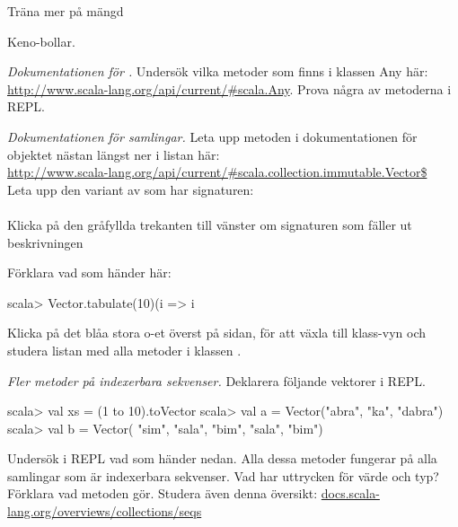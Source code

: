 {{\Task \TODO Träna mer på mängd  

\Subtask \TODO Keno-bollar.






\AdvancedTasks %

\Task \emph{Dokumentationen för .} Undersök vilka metoder som finns i klassen Any här: \href{http://www.scala-lang.org/api/current/\#scala.Any}{http://www.scala-lang.org/api/current/\#scala.Any}. Prova några av metoderna i REPL.

\Task \emph{Dokumentationen för samlingar.} Leta upp metoden  i dokumentationen för objektet  nästan längst ner i listan här: \\ \href{http://www.scala-lang.org/api/current/#scala.collection.immutable.Vector$}{http://www.scala-lang.org/api/current/\#scala.collection.immutable.Vector\$} \\Leta upp den variant av  som har signaturen:\\ \\ Klicka på den gråfyllda trekanten till vänster om signaturen som fäller ut beskrivningen

\Subtask Förklara vad som händer här:
\begin{REPLnonum}
scala> Vector.tabulate(10)(i => i %
\end{REPLnonum}

\Subtask Klicka på det blåa stora o-et överst på sidan, för att växla till klass-vyn och studera listan med alla metoder  i klassen . 


\Task \emph{Fler metoder på indexerbara sekvenser.} Deklarera följande vektorer i REPL. 
\begin{REPL}
scala> val xs = (1 to 10).toVector
scala> val a = Vector("abra", "ka", "dabra")
scala> val b = Vector( "sim", "sala", "bim", "sala", "bim")
\end{REPL}
Undersök i REPL vad som händer nedan. Alla dessa metoder fungerar på alla samlingar som är indexerbara sekvenser. Vad har uttrycken för värde och typ? Förklara vad metoden gör. Studera även denna  översikt: \href{http://docs.scala-lang.org/overviews/collections/seqs}{docs.scala-lang.org/overviews/collections/seqs}

\Subtask {}  %

\Subtask {}  %

}}
